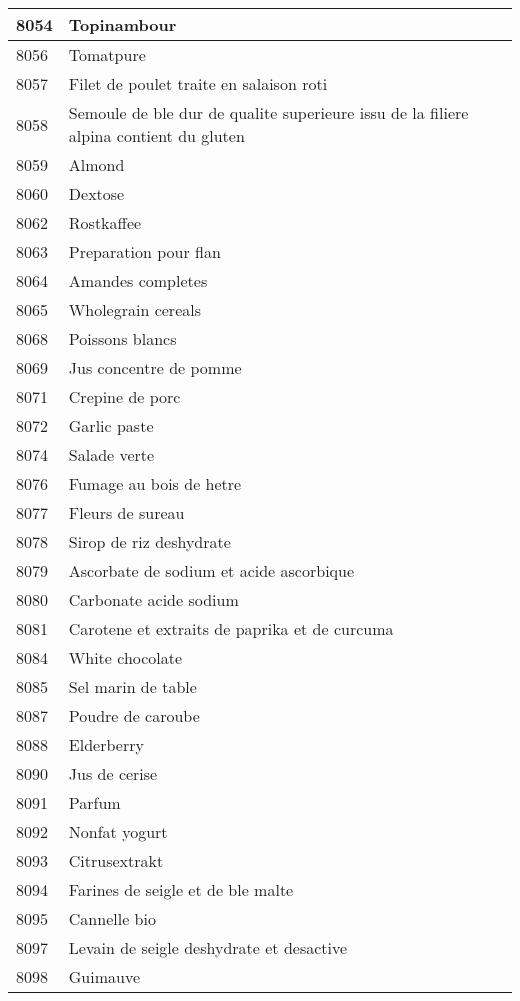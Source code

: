 \begin{longtable}{|l|l|}
8054 & Topinambour \\ \hline 
8056 & Tomatpure \\ \hline 
8057 & Filet de poulet traite en salaison roti \\ \hline 
8058 & Semoule de ble dur de qualite superieure  issu de la filiere alpina contient du gluten \\ \hline 
8059 & Almond \\ \hline 
8060 & Dextose \\ \hline 
8062 & Rostkaffee \\ \hline 
8063 & Preparation pour flan \\ \hline 
8064 & Amandes completes \\ \hline 
8065 & Wholegrain cereals \\ \hline 
8068 & Poissons blancs \\ \hline 
8069 & Jus concentre de pomme \\ \hline 
8071 & Crepine de porc \\ \hline 
8072 & Garlic paste \\ \hline 
8074 & Salade verte \\ \hline 
8076 & Fumage au bois de hetre \\ \hline 
8077 & Fleurs de sureau \\ \hline 
8078 & Sirop de riz deshydrate \\ \hline 
8079 & Ascorbate de sodium et acide ascorbique \\ \hline 
8080 & Carbonate acide sodium \\ \hline 
8081 & Carotene et extraits de paprika et de curcuma \\ \hline 
8084 & White chocolate \\ \hline 
8085 & Sel marin de table \\ \hline 
8087 & Poudre de caroube \\ \hline 
8088 & Elderberry \\ \hline 
8090 & Jus de cerise \\ \hline 
8091 & Parfum \\ \hline 
8092 & Nonfat yogurt \\ \hline 
8093 & Citrusextrakt \\ \hline 
8094 & Farines de seigle et de ble malte \\ \hline 
8095 & Cannelle bio \\ \hline 
8097 & Levain de seigle deshydrate et desactive \\ \hline 
8098 & Guimauve \\ \hline 

\end{longtable}
